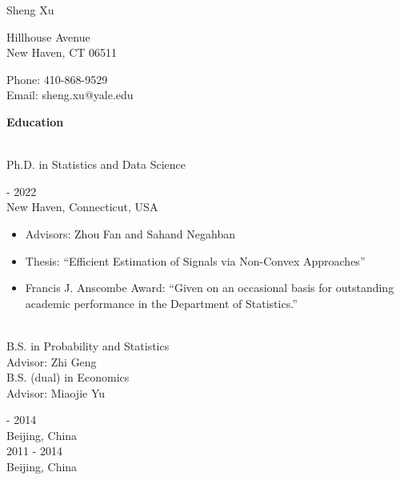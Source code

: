 \documentclass{article}
\begin{document}
\begin{Huge}
\noindent Sheng Xu
\end{Huge}

\vspace{5mm}
\begin{minipage}{0.7\linewidth}
  \flushleft
{} Hillhouse Avenue \\
\noindent New Haven, CT 06511
\end{minipage}
\hfill
\begin{minipage}{0.29\linewidth}
  Phone: 410-868-9529 \\
  Email: sheng.xu@yale.edu
\end{minipage}

\vspace{5mm}
\begin{large}
\noindent \textbf{Education}
\end{large}
\vspace{5mm}


\begin{minipage}{0.65\linewidth}
\\
Ph.D. in Statistics and Data Science\\
\end{minipage}\hfill
\begin{minipage}{0.34\linewidth}
 - 2022\\
New Haven, Connecticut, USA\\
\end{minipage}
\vspace{-6mm}
\begin{itemize}
\setlength{\itemsep}{-0.5mm}
\item[\raisebox{0.25ex}{\tiny$\bullet$}] Advisors: Zhou Fan and Sahand Negahban
\item[\raisebox{0.25ex}{\tiny$\bullet$}] Thesis: ``Efficient Estimation of Signals via Non-Convex Approaches''
\item[\raisebox{0.25ex}{\tiny$\bullet$}] Francis J. Anscombe Award: “Given on an occasional basis for outstanding academic performance in the Department of Statistics.”
\end{itemize}

\begin{minipage}{0.65\linewidth}
\\
B.S. in Probability and Statistics\\
Advisor: Zhi Geng\\
B.S. (dual) in Economics\\
Advisor: Miaojie Yu\\
\end{minipage}\hfill
\begin{minipage}{0.34\linewidth}
 - 2014\\
Beijing, China\\
2011 - 2014\\
Beijing, China\\
\end{minipage}
\end{document}
